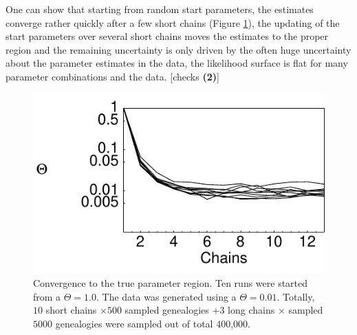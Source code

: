 One can show that starting from random start parameters, the estimates
converge rather quickly after a few short chains (Figure \ref{fig:convergence}), the updating of
the start parameters over several short chains moves the estimates to the
proper region and the remaining uncertainty is only driven by the
often huge uncertainty about the parameter estimates in the data, 
the likelihood surface is flat for many parameter combinations and 
the data. [checks {\bf (2)}] 
\begin{figure}[hpbt]
\begin{center}
\includegraphics[width=12cm]{mim/convergence_singlepop}
\end{center}
\vskip -0.5cm
\caption{Convergence to the true parameter region. 
Ten runs were started from a $\Theta=1.0$. The data was generated using
a $\Theta=0.01$.
Totally, $10$ short chains $\times 500$ sampled genealogies 
$+ 3$ long chains $\times$ sampled $5000$ genealogies were sampled out of
total 400,000.
}
\label{fig:convergence}
\end{figure}

